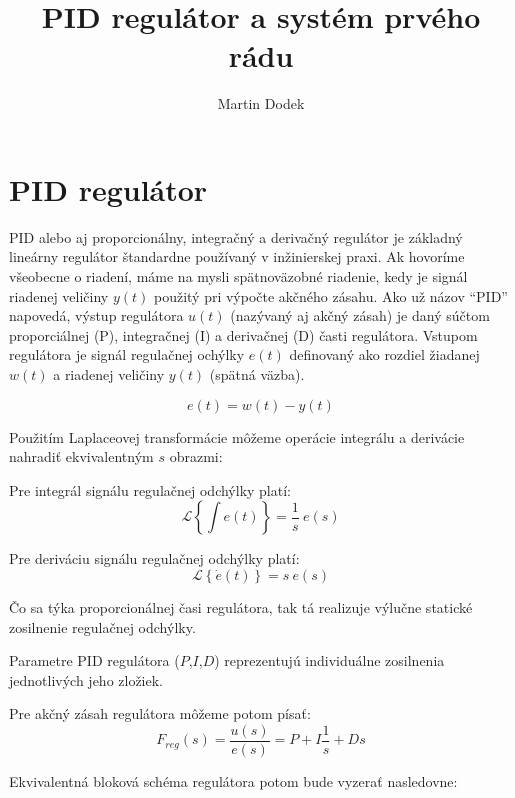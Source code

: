 \documentclass[a4paper,10pt]{article}
\begin{document}
\title{PID regulátor a systém prvého rádu}

\author{Martin Dodek}
\pagestyle{plain}
\maketitle

\section{PID regulátor}
PID alebo aj proporcionálny, integračný a derivačný regulátor je základný lineárny regulátor štandardne používaný v inžinierskej praxi.
Ak hovoríme všeobecne o riadení, máme na mysli spätnoväzobné riadenie, kedy je signál riadenej veličiny $y(t)$ použitý pri výpočte akčného zásahu.
Ako už názov ``PID'' napovedá, výstup regulátora $u(t)$ (nazývaný aj akčný zásah) je daný súčtom proporciálnej (P), integračnej (I) a derivačnej (D) časti regulátora. Vstupom regulátora je signál regulačnej ochýlky $e(t)$ definovaný ako rozdiel žiadanej $w(t)$ a riadenej veličiny $y(t)$ (spätná väzba). 

\begin{equation}
\label{eq:e}
	e(t)=w(t)-y(t)
\end{equation}

Použitím Laplaceovej transformácie môžeme operácie integrálu a derivácie nahradiť ekvivalentným $s$ obrazmi:

Pre integrál signálu regulačnej odchýlky platí:
\begin{equation}
	\mathcal{L}\left\lbrace\int{e}(t) \right\rbrace=\frac{1}{s}\: e(s)
\end{equation}

Pre deriváciu signálu regulačnej odchýlky platí:
\begin{equation}
	\mathcal{L}\left\lbrace\dot{e}(t) \right\rbrace=s\: e(s)
\end{equation}

Čo sa týka proporcionálnej časi regulátora, tak tá realizuje výlučne statické zosilnenie regulačnej odchýlky.

Parametre PID regulátora ($P$,$I$,$D$) reprezentujú individuálne zosilnenia jednotlivých jeho zložiek.

Pre akčný zásah regulátora môžeme potom písať:
\begin{equation}
 \label{eq:PID}
 F_{reg}(s)=\frac{u(s)}{e(s)}= P+ I\frac{1}{s}+Ds
\end{equation}

Ekvivalentná bloková schéma regulátora potom bude vyzerať nasledovne:
\end{document}
